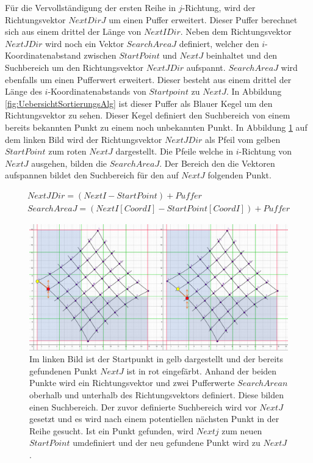 Für die Vervollständigung der ersten Reihe in $j$-Richtung, wird der Richtungsvektor $NextDirJ$ um einen Puffer erweitert. Dieser Puffer berechnet sich aus einem drittel der Länge von $NextIDir$. Neben dem Richtungsvektor $NextJDir$ wird noch ein Vektor $SearchAreaJ$ definiert, welcher den $i$-Koordinatenabstand zwischen $StartPoint$ und $NextJ$ beinhaltet und den Suchbereich um den Richtungsvektor $NextJDir$ aufspannt. $SearchAreaJ$ wird ebenfalls um einen Pufferwert erweitert. Dieser besteht aus einem drittel der Länge des $i$-Koordinatenabstands von $Startpoint$ zu $NextJ$. In Abbildung \ref{fig:UebersichtSortierungsAlg} ist dieser Puffer als Blauer Kegel um den Richtungsvektor zu sehen. Dieser Kegel definiert den Suchbereich von einem bereits bekannten Punkt zu einem noch unbekannten Punkt. In Abbildung \ref{fig:IListJList} auf dem linken Bild wird der Richtungsvektor $NextJDir$ als Pfeil vom gelben $StartPoint$ zum roten $NextJ$ dargestellt. Die Pfeile welche in $i$-Richtung von $NextJ$ ausgehen, bilden die $SearchAreaJ$. Der Bereich den die Vektoren aufspannen bildet den Suchbereich für den auf $NextJ$ folgenden Punkt.

\begin{gather*}
	NextJDir = (NextI - StartPoint) + Puffer\\
	SearchAreaJ = (NextI[CoordI]-StartPoint[CoordI]) + Puffer
\end{gather*}


\begin{figure}[!htb]
	\centering
	\includegraphics[width=0.8\linewidth]{images/VerzeichnetesSchachbrett_4.png}
	\caption[Suche nach $NextJ$]{Im linken Bild ist der Startpunkt in gelb dargestellt und der bereits gefundenen Punkt $NextJ$ ist in rot eingefärbt. Anhand der beiden Punkte wird ein Richtungsvektor  und zwei Pufferwerte $SearchArean$ oberhalb und unterhalb des Richtungsvektors definiert. Diese bilden einen Suchbereich. Der zuvor definierte Suchbereich wird vor $NextJ$ gesetzt und es wird nach einem potentiellen nächsten Punkt in der Reihe gesucht. Ist ein Punkt gefunden, wird $Nextj$ zum neuen $StartPoint$ umdefiniert und der neu gefundene Punkt wird zu $NextJ$.}
	\label{fig:IListJList}
\end{figure}
\pagebreak

